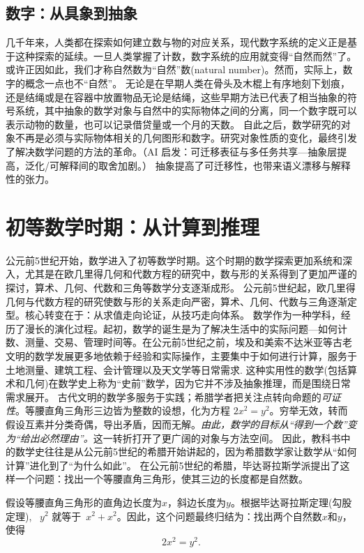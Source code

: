 \subsection{数字：从具象到抽象}

几千年来，人类都在探索如何建立数与物的对应关系，现代数字系统的定义正是基于这种探索的延续。一旦人类掌握了计数，数字系统的应用就变得“自然而然”了。或许正因如此，我们才称自然数为“自然”数(natural number)。然而，实际上，数字的概念一点也不“自然”。
无论是在早期人类在骨头及木棍上有序地刻下划痕，还是结绳或是在容器中放置物品无论是结绳，这些早期方法已代表了相当抽象的符号系统，其中抽象的数学对象与自然中的实际物体之间的分离，同一个数字既可以表示动物的数量，也可以记录借贷量或一个月的天数。
自此之后，数学研究的对象不再是必须与实际物体相关的几何图形和数字。研究对象性质的变化，最终引发了解决数学问题的方法的革命。{（AI 启发：可迁移表征与多任务共享—抽象层提高，泛化/可解释间的取舍加剧。）}
抽象提高了可迁移性，也带来语义漂移与解释性的张力。


\section{初等数学时期：从计算到推理}

公元前5世纪开始，数学进入了初等数学时期。这个时期的数学探索更加系统和深入，尤其是在欧几里得几何和代数方程的研究中，数与形的关系得到了更加严谨的探讨，算术、几何、代数和三角等数学分支逐渐成形。
公元前5世纪起，欧几里得几何与代数方程的研究使数与形的关系走向严密，算术、几何、代数与三角逐渐定型。核心转变在于：从求值走向论证，从技巧走向体系。
数学作为一种学科，经历了漫长的演化过程。起初，数学的诞生是为了解决生活中的实际问题---如何计数、测量、交易、管理时间等。在公元前5世纪之前，埃及和美索不达米亚等古老文明的数学发展更多地依赖于经验和实际操作，主要集中于如何进行计算，服务于土地测量、建筑工程、会计管理以及天文学等日常需求.
这种实用性的数学(包括算术和几何)在数学史上称为“史前”数学，因为它并不涉及抽象推理，而是围绕日常需求展开。
古代文明的数学多服务于实践；希腊学者把关注点转向命题的\emph{可证性}。等腰直角三角形三边皆为整数的设想，化为方程 $2x^2=y^2$。穷举无效，转而假设互素并分类奇偶，导出矛盾，因而无解。\emph{由此，数学的目标从“得到一个数”变为“给出必然理由”。}这一转折打开了更广阔的对象与方法空间。
因此，教科书中的数学史往往是从公元前5世纪的希腊开始讲起的，因为希腊数学家让数学从“如何计算”进化到了“为什么如此”。
在公元前5世纪的希腊，毕达哥拉斯学派提出了这样一个问题：找出一个等腰直角三角形，使其三边的长度都是自然数。


假设等腰直角三角形的直角边长度为$x$，斜边长度为$y$。根据毕达哥拉斯定理(勾股定理), ~$y^2$ 就等于~$x^2+x^2$。因此，这个问题最终归结为：找出两个自然数$x$和$y$，使得
\begin{equation}\label{eqn}
2x^2=y^2.

\end{equation}

